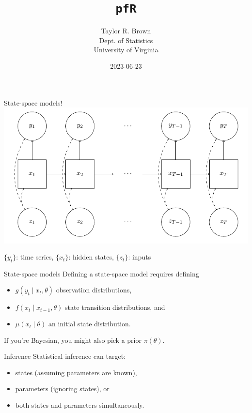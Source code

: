 \documentclass[
  ignorenonframetext,
]{beamer}
\title{\texttt{pfR}}
\author{Taylor R. Brown\\
Dept. of Statistics\\
University of Virginia}
\date{2023-06-23}
\providecommand{\tightlist}{%
  \setlength{\itemsep}{0pt}\setlength{\parskip}{0pt}}
\begin{document}
\frame{\titlepage}

\begin{frame}{State-space models!}
\protect\hypertarget{state-space-models}{}
\includegraphics[width=1\linewidth]{pics/ssm_diagram_1-1}

\(\{y_t\}\): time series, \(\{x_t\}\): hidden states, \(\{z_t\}\):
inputs
\end{frame}

\begin{frame}{State-space models}
\protect\hypertarget{state-space-models-1}{}
Defining a state-space model requires defining

\begin{itemize}
\tightlist
\item
  \(g(y_t \mid x_t, \theta)\) observation distributions,
\item
  \(f(x_t \mid x_{t-1}, \theta)\) state transition distributions, and
\item
  \(\mu(x_t \mid \theta)\) an initial state distribution.
\end{itemize}

If you're Bayesian, you might also pick a prior \(\pi(\theta)\).
\end{frame}

\begin{frame}{Inference}
\protect\hypertarget{inference}{}
Statistical inference can target:

\begin{itemize}
\tightlist
\item
  states (assuming parameters are known),
\item
  parameters (ignoring states), or
\item
  both states and parameters simultaneously.
\end{itemize}
\end{frame}
\end{document}

